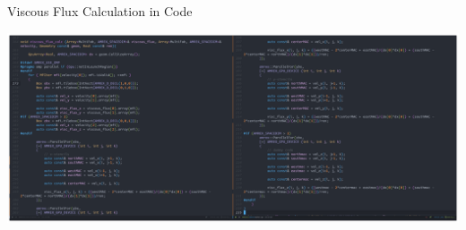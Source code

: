 \documentclass[aspectratio=169, sectionpages, codemintedoverleaf, bibref]{beamer}
\begin{document}
\begin{frame}[c]{Viscous Flux Calculation in Code}
    \begin{center}
        \includegraphics[width=\textwidth]{viscous_term}
    \end{center}
\end{frame}
\end{document}
